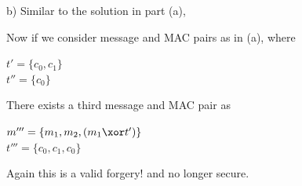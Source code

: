 b) 
Similar to the solution in part (a),

Now if we consider message and MAC pairs as in (a), where 
\begin{center}
    $t' = \{c_0, c_1\}$\\
    $t'' = \{c_0\}$\\
\end{center}

There exists a third message and MAC pair as
\begin{center}
    $m''' = \{m_1, m_2, (m_1 \xor t')\}$\\
    $t''' = \{c_0,c_1,c_0\}$\\
\end{center}

Again this is a valid forgery! and no longer secure.
